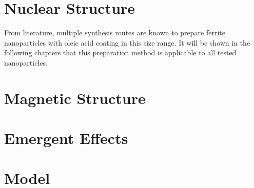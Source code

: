 \documentclass[\main/dresen_thesis.tex]{subfiles}
\begin{document}
    \section{Nuclear Structure}
      From literature, multiple synthesis routes are known to prepare ferrite nanoparticles with oleic acid coating in this size range. It will be shown in the following chapters that this preparation method is applicable to all tested nanoparticles.

    \section{Magnetic Structure}

    \section{Emergent Effects}

    \section{Model}
\end{document}

